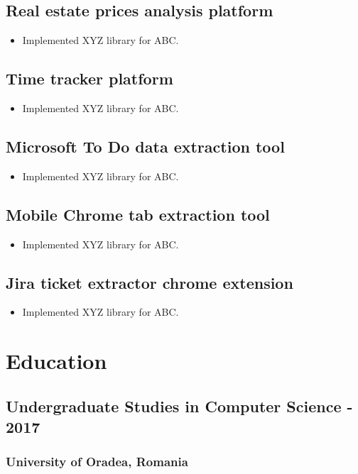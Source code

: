 \documentclass[11pt]{article}
\begin{document}
    \subsection{Real estate prices analysis platform}
    \begin{itemize}
        \item[\checkmark] Implemented XYZ library for ABC.
    \end{itemize}

    \subsection{Time tracker platform}
    \begin{itemize}
        \item[\checkmark] Implemented XYZ library for ABC.
    \end{itemize}

    \subsection{Microsoft To Do data extraction tool}
    \begin{itemize}
        \item[\checkmark] Implemented XYZ library for ABC.
    \end{itemize}

    \subsection{Mobile Chrome tab extraction tool}
    \begin{itemize}
        \item[\checkmark] Implemented XYZ library for ABC.
    \end{itemize}

    \subsection{Jira ticket extractor chrome extension}
    \begin{itemize}
        \item[\checkmark] Implemented XYZ library for ABC.
    \end{itemize}

    \section{Education}
    \subsection{Undergraduate Studies in Computer Science\hfill {} - 2017}  
    \subsubsection{University of Oradea,  Romania}
        
    
\end{document}
